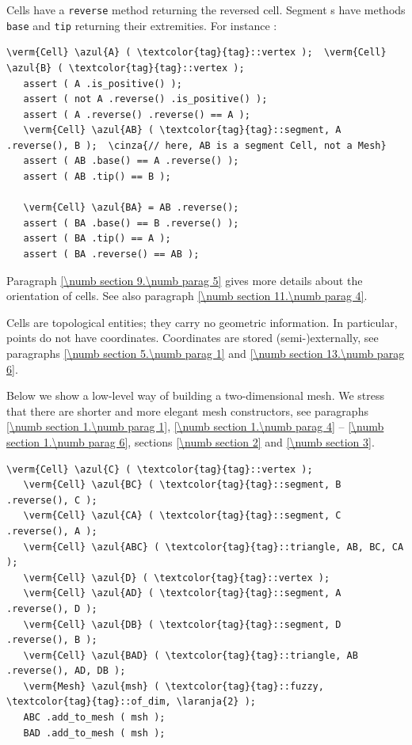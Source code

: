 Cells have a {\small\tt reverse} method returning the reversed cell.
Segment {\small\tt{}}s have methods {\small\tt base} and {\small\tt tip}
returning their extremities.
For instance :

\begin{Verbatim}[commandchars=\\\{\},formatcom=\small\tt,baselinestretch=0.94]
   \verm{Cell} \azul{A} ( \textcolor{tag}{tag}::vertex );  \verm{Cell} \azul{B} ( \textcolor{tag}{tag}::vertex );
   assert ( A .is_positive() );
   assert ( not A .reverse() .is_positive() );
   assert ( A .reverse() .reverse() == A );
   \verm{Cell} \azul{AB} ( \textcolor{tag}{tag}::segment, A .reverse(), B );  \cinza{// here, AB is a segment Cell, not a Mesh}
   assert ( AB .base() == A .reverse() );
   assert ( AB .tip() == B );

   \verm{Cell} \azul{BA} = AB .reverse();
   assert ( BA .base() == B .reverse() );
   assert ( BA .tip() == A );
   assert ( BA .reverse() == AB );
\end{Verbatim}

Paragraph \ref{\numb section 9.\numb parag 5} gives more details about the orientation of cells.
See also paragraph \ref{\numb section 11.\numb parag 4}.

Cells are topological entities; they carry no geometric information.
In particular, points do not have coordinates.
Coordinates are stored (semi-)externally, see paragraphs \ref{\numb section 5.\numb parag 1} and
\ref{\numb section 13.\numb parag 6}.

Below we show a low-level way of building a two-dimensional mesh.
We stress that there are shorter and more elegant mesh constructors, see paragraphs
\ref{\numb section 1.\numb parag 1}, \ref{\numb section 1.\numb parag 4} --
\ref{\numb section 1.\numb parag 6}, sections \ref{\numb section 2} and \ref{\numb section 3}.

\begin{Verbatim}[commandchars=\\\{\},formatcom=\small\tt,baselinestretch=0.94]
   \verm{Cell} \azul{C} ( \textcolor{tag}{tag}::vertex );
   \verm{Cell} \azul{BC} ( \textcolor{tag}{tag}::segment, B .reverse(), C );
   \verm{Cell} \azul{CA} ( \textcolor{tag}{tag}::segment, C .reverse(), A );
   \verm{Cell} \azul{ABC} ( \textcolor{tag}{tag}::triangle, AB, BC, CA );
   \verm{Cell} \azul{D} ( \textcolor{tag}{tag}::vertex );
   \verm{Cell} \azul{AD} ( \textcolor{tag}{tag}::segment, A .reverse(), D );
   \verm{Cell} \azul{DB} ( \textcolor{tag}{tag}::segment, D .reverse(), B );
   \verm{Cell} \azul{BAD} ( \textcolor{tag}{tag}::triangle, AB .reverse(), AD, DB );
   \verm{Mesh} \azul{msh} ( \textcolor{tag}{tag}::fuzzy, \textcolor{tag}{tag}::of_dim, \laranja{2} );
   ABC .add_to_mesh ( msh );
   BAD .add_to_mesh ( msh );
\end{Verbatim}


